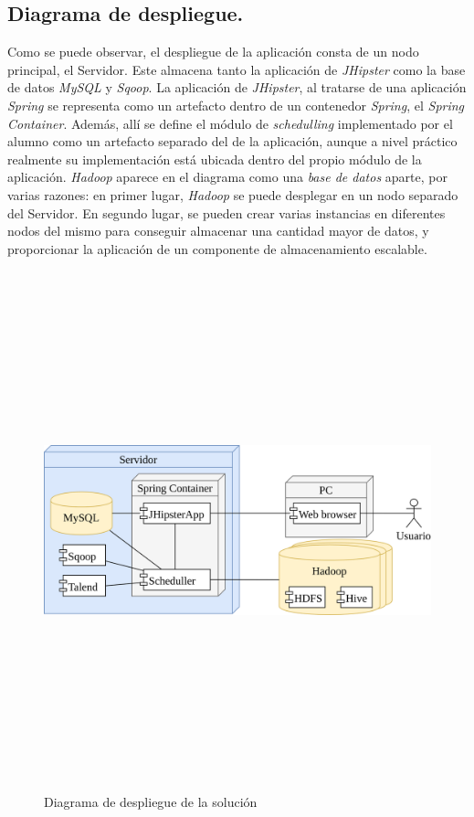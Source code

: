 \subsection{Diagrama de despliegue.} \label{disenyo.arquitectura.despliegue}
\par Como se puede observar, el despliegue de la aplicación consta de un nodo principal, el Servidor. Este almacena tanto la aplicación de \textit{JHipster} como la base de datos \textit{MySQL} y \textit{Sqoop}. La aplicación de \textit{JHipster}, al tratarse de una aplicación \textit{Spring} se representa como un artefacto dentro de un contenedor \textit{Spring}, el \textit{Spring Container}. Además, allí se define el módulo de \textit{schedulling} implementado por el alumno como un artefacto separado del de la aplicación, aunque a nivel práctico realmente su implementación está ubicada dentro del propio módulo de la aplicación. \textit{Hadoop} aparece en el diagrama como una \textit{base de datos} aparte, por varias razones: en primer lugar, \textit{Hadoop} se puede desplegar en un nodo separado del Servidor. En segundo lugar, se pueden crear varias instancias en diferentes nodos del mismo para conseguir almacenar una cantidad mayor de datos, y proporcionar la aplicación de un componente de almacenamiento escalable.
\begin{figure}[H]
    \centering
    \includegraphics[width=1\textwidth,height=15cm,keepaspectratio]{Imagenes/despliegue}
    \caption{Diagrama de despliegue de la solución}
    \label{fig:despliegue}
\end{figure}

